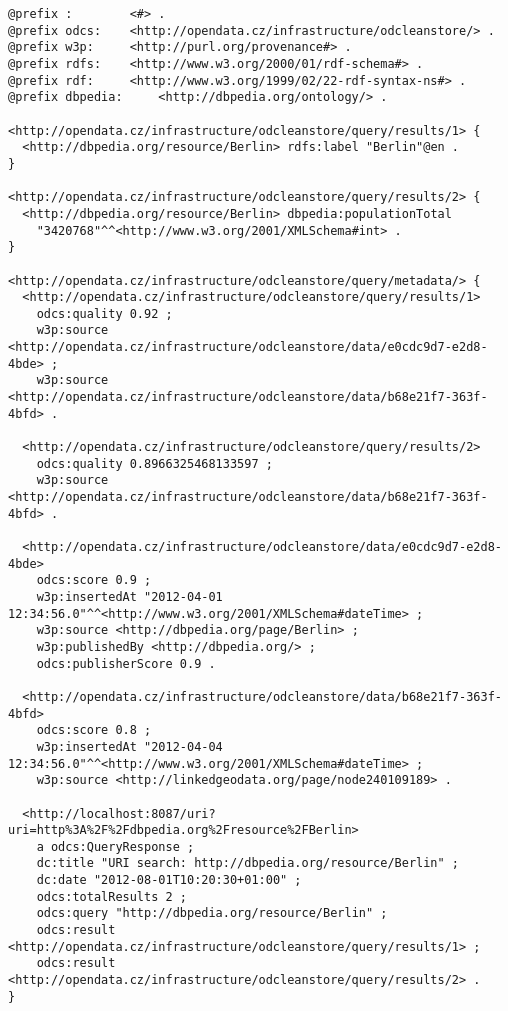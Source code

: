 \begin{lstlisting}[caption={Example of URI or keyword query response in TriG},label=lst:URIKWTrigResponse]
@prefix :        <#> .
@prefix odcs:    <http://opendata.cz/infrastructure/odcleanstore/> .
@prefix w3p:     <http://purl.org/provenance#> .
@prefix rdfs:    <http://www.w3.org/2000/01/rdf-schema#> .
@prefix rdf:     <http://www.w3.org/1999/02/22-rdf-syntax-ns#> .
@prefix dbpedia:     <http://dbpedia.org/ontology/> .

<http://opendata.cz/infrastructure/odcleanstore/query/results/1> {
  <http://dbpedia.org/resource/Berlin> rdfs:label "Berlin"@en .
}

<http://opendata.cz/infrastructure/odcleanstore/query/results/2> {
  <http://dbpedia.org/resource/Berlin> dbpedia:populationTotal
    "3420768"^^<http://www.w3.org/2001/XMLSchema#int> .
}

<http://opendata.cz/infrastructure/odcleanstore/query/metadata/> {
  <http://opendata.cz/infrastructure/odcleanstore/query/results/1>
    odcs:quality 0.92 ;
    w3p:source <http://opendata.cz/infrastructure/odcleanstore/data/e0cdc9d7-e2d8-4bde> ;
    w3p:source <http://opendata.cz/infrastructure/odcleanstore/data/b68e21f7-363f-4bfd> .

  <http://opendata.cz/infrastructure/odcleanstore/query/results/2>
    odcs:quality 0.8966325468133597 ;
    w3p:source <http://opendata.cz/infrastructure/odcleanstore/data/b68e21f7-363f-4bfd> .

  <http://opendata.cz/infrastructure/odcleanstore/data/e0cdc9d7-e2d8-4bde>
    odcs:score 0.9 ;
    w3p:insertedAt "2012-04-01 12:34:56.0"^^<http://www.w3.org/2001/XMLSchema#dateTime> ;
    w3p:source <http://dbpedia.org/page/Berlin> ;
    w3p:publishedBy <http://dbpedia.org/> ;
    odcs:publisherScore 0.9 .

  <http://opendata.cz/infrastructure/odcleanstore/data/b68e21f7-363f-4bfd>
    odcs:score 0.8 ;
    w3p:insertedAt "2012-04-04 12:34:56.0"^^<http://www.w3.org/2001/XMLSchema#dateTime> ;
    w3p:source <http://linkedgeodata.org/page/node240109189> .

  <http://localhost:8087/uri?uri=http%3A%2F%2Fdbpedia.org%2Fresource%2FBerlin>
    a odcs:QueryResponse ;
    dc:title "URI search: http://dbpedia.org/resource/Berlin" ;
    dc:date "2012-08-01T10:20:30+01:00" ;
    odcs:totalResults 2 ;
    odcs:query "http://dbpedia.org/resource/Berlin" ;
    odcs:result <http://opendata.cz/infrastructure/odcleanstore/query/results/1> ;
    odcs:result <http://opendata.cz/infrastructure/odcleanstore/query/results/2> .
}
\end{lstlisting}

